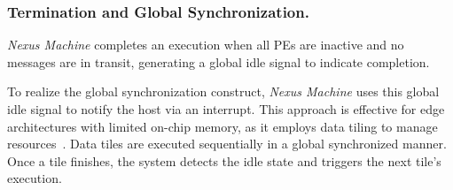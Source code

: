 \subsubsection{Termination and Global Synchronization.}
\textit{Nexus Machine} completes an execution when all PEs are inactive and no messages are in transit, generating a global idle signal to indicate completion.

To realize the global synchronization construct, \textit{Nexus Machine} uses this global idle signal to notify the host via an interrupt. This approach is effective for edge architectures with limited on-chip memory, as it employs data tiling to manage resources~\cite{extensor, tiling}. Data tiles are executed sequentially in a global synchronized manner. Once a tile finishes, the system detects the idle state and triggers the next tile's execution.